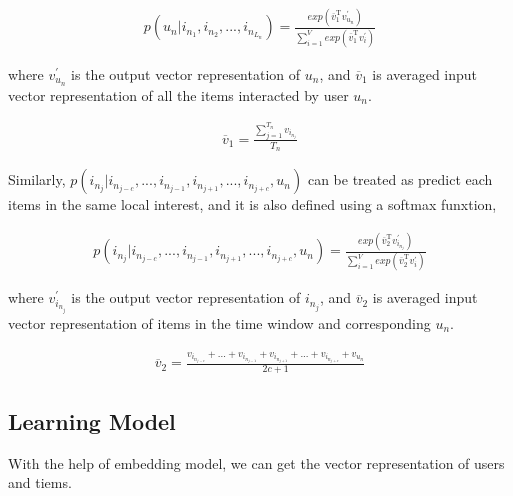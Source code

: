 \documentclass{sig-alternate-05-2015}
\begin{document}
\begin{equation}
\begin{aligned}
	p(u_n | i_{n_1}, i_{n_2}, ..., i_{n_{L_n}}) =
	\frac
	{
		exp( \overline{v}_{1}^{\mathrm{T}} v_{u_n}^{'} )
	}
	{
		\sum_{i=1}^{V} exp( \overline{v}_{1}^{\mathrm{T}} v_{i}^{'} )
	}
\end{aligned}
\end{equation}

where $v_{u_n}^{'}$ is the output vector representation of $u_n$,
and $\overline{v}_{1}$ is averaged input vector representation of all the items
interacted by user $u_n$.

\begin{equation}
\begin{aligned}
	\overline{v}_{1} = \frac{\sum_{j=1}^{T_n} v_{i_{n_j}}}{T_n}
\end{aligned}
\end{equation}

Similarly, $p(i_{n_j} | i_{n_{j-c}}, ..., i_{n_{j-1}}, i_{n_{j+1}},..., i_{n_{j+c}}, u_n)$
can be treated as predict each items in the same local interest,
and it is also defined using a softmax funxtion,

\begin{equation}
\begin{aligned}
	p(i_{n_j} | i_{n_{j-c}}, ..., i_{n_{j-1}}, i_{n_{j+1}},..., i_{n_{j+c}}, u_n) =
	\frac
	{
		exp( \overline{v}_{2}^{\mathrm{T}} v_{i_{n_j}}^{'} )
	}
	{
		\sum_{i=1}^{V} exp( \overline{v}_{2}^{\mathrm{T}} v_{i}^{'} )
	}
\end{aligned}
\end{equation}

where $v_{i_{n_j}}^{'}$ is the output vector representation of $i_{n_j}$,
and $\overline{v}_{2}$ is averaged input vector representation of items in the time window
and corresponding $u_n$.

\begin{equation}
\begin{aligned}
	\overline{v}_{2} = \frac{ v_{i_{n_{j-c}}} + ... + v_{i_{n_{j-1}}} + 
	v_{i_{n_{j+1}}} + ... + v_{i_{n_{j+c}}} + v_{u_n} }{2c+1}
\end{aligned}
\end{equation}


\subsection{Learning Model}
With the help of embedding model, we can get the vector representation of users and tiems.
\end{document}

